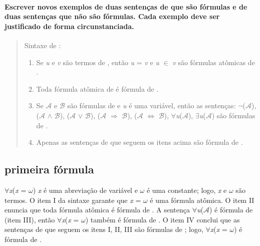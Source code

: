 
\paragraph{Escrever novos exemplos de duas sentenças de  que são fórmulas e de duas sentenças que	não são fórmulas. Cada exemplo deve ser justificado de forma circunstanciada.}
\begin{quote}
	Sintaxe de :
	\begin{enumerate}[label=\roman*., itemsep=0pt, topsep=0pt]
		\item Se \textit{u} e \textit{v} são termos de , então \textit{u} = \textit{v}
		e \textit{u} $\in$ \textit{v} são fórmulas atômicas de .
		\item Toda fórmula atômica de  é fórmula de .
		\item Se $\mathcal{A}$ e $\mathcal{B}$ são fórmulas de  e \textit{u} é uma variável, então as sentenças: $\lnot$($\mathcal{A}$), ($\mathcal{A}$ $\land$ $\mathcal{B}$), ($\mathcal{A}$ $\lor$ $\mathcal{B}$), \newline($\mathcal{A}$ $\Rightarrow$ $\mathcal{B}$), ($\mathcal{A}$ $\Leftrightarrow$ $\mathcal{B}$), $\forall$\textit{u}($\mathcal{A}$), $\exists$\textit{u}($\mathcal{A}$) são fórmulas de .
		\item Apenas as sentenças de  que seguem os itens acima são fórmula de .
	\end{enumerate}
\end{quote}

\subsection{primeira fórmula}
$\forall$\textit{x}(\textit{x} = $\omega$)
\newline
\textit{x} é uma abreviação de variável e $\omega$ é uma constante; logo, \textit{x} e $\omega$ são termos. O item I da sintaxe 
garante que \textit{x} = $\omega$ é uma fórmula atômica. O item II enuncia que toda fórmula atômica é fórmula de .
A sentença $\forall$\textit{u}($\mathcal{A}$) é fórmula de (item III), então $\forall$\textit{x}(\textit{x} = $\omega$) também é fórmula de . O item IV conclui que as sentenças de  que seguem os itens I, II, III são fórmulas de ; logo,
$\forall$\textit{x}(\textit{x} = $\omega$) é fórmula de .

